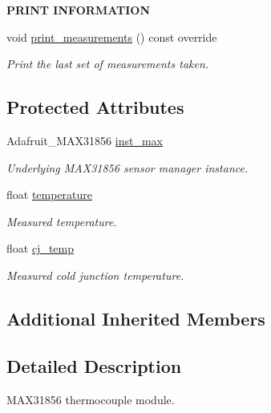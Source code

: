 \begin{Indent}{\bf P\+R\+I\+NT I\+N\+F\+O\+R\+M\+A\+T\+I\+ON}\par
\begin{DoxyCompactItemize}
\item 
void \hyperlink{class_loom___m_a_x31856_a197dc843c246a5ac17edd62499ed5c60}{print\+\_\+measurements} () const override
\begin{DoxyCompactList}\small\item\em Print the last set of measurements taken. \end{DoxyCompactList}\end{DoxyCompactItemize}
\end{Indent}
\subsection*{Protected Attributes}
\begin{DoxyCompactItemize}
\item 
Adafruit\+\_\+\+M\+A\+X31856 \hyperlink{class_loom___m_a_x31856_ac4f07d257613a0c750438ebfc33d03a8}{inst\+\_\+max}
\begin{DoxyCompactList}\small\item\em Underlying M\+A\+X31856 sensor manager instance. \end{DoxyCompactList}\item 
float \hyperlink{class_loom___m_a_x31856_a108e2bfbf0836dce8b3ec9d4790bf94c}{temperature}
\begin{DoxyCompactList}\small\item\em Measured temperature. \end{DoxyCompactList}\item 
float \hyperlink{class_loom___m_a_x31856_af5eb2323d4f26391f72a0a9e81307f51}{cj\+\_\+temp}
\begin{DoxyCompactList}\small\item\em Measured cold junction temperature. \end{DoxyCompactList}\end{DoxyCompactItemize}
\subsection*{Additional Inherited Members}


\subsection{Detailed Description}
M\+A\+X31856 thermocouple module. 

